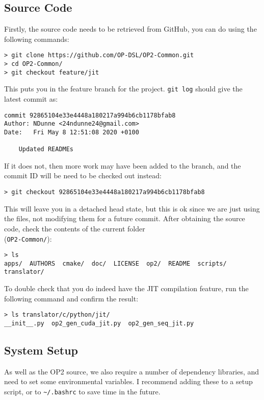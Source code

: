 \subsection{Source Code}
Firstly, the source code needs to be retrieved from GitHub, you can do using the following commands:
\begin{verbatim}
> git clone https://github.com/OP-DSL/OP2-Common.git
> cd OP2-Common/
> git checkout feature/jit
\end{verbatim}
This puts you in the feature branch for the project. \verb|git log| should give the latest commit as:
\begin{lstlisting}
commit 92865104e33e4448a180217a994b6cb1178bfab8
Author: NDunne <24ndunne24@gmail.com>
Date:   Fri May 8 12:51:08 2020 +0100

    Updated READMEs
\end{lstlisting}
If it does not, then more work may have been added to the branch, and the commit ID will be need to be checked out instead:
\begin{verbatim}
> git checkout 92865104e33e4448a180217a994b6cb1178bfab8
\end{verbatim}
This will leave you in a detached head state, but this is ok since we are just using the files, not modifying them for a future commit.
\clearpage
\noindent After obtaining the source code, check the contents of the current folder\\ (\verb|OP2-Common/|):
\begin{verbatim}
> ls
apps/  AUTHORS  cmake/  doc/  LICENSE  op2/  README  scripts/  translator/
\end{verbatim}
To double check that you do indeed have the JIT compilation feature, run the following command and confirm the result:
\begin{verbatim}
> ls translator/c/python/jit/
__init__.py  op2_gen_cuda_jit.py  op2_gen_seq_jit.py
\end{verbatim}

\subsection{System Setup}
As well as the OP2 source, we also require a number of dependency libraries, and need to set some environmental variables. I recommend adding these to a setup script, or to \verb|~/.bashrc| to save time in the future.

